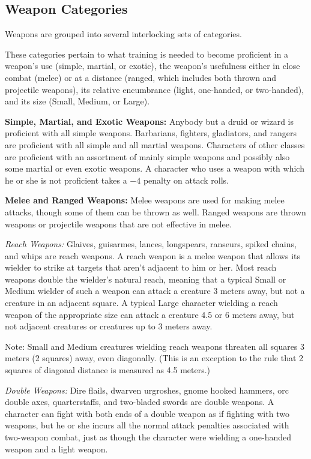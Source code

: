 \subsection{Weapon Categories}
Weapons are grouped into several interlocking sets of categories.

These categories pertain to what training is needed to become proficient in a weapon's use (simple, martial, or exotic), the weapon's usefulness either in close combat (melee) or at a distance (ranged, which includes both thrown and projectile weapons), its relative encumbrance (light, one-handed, or two-handed), and its size (Small, Medium, or Large).

\textbf{Simple, Martial, and Exotic Weapons:} Anybody but a druid or wizard is proficient with all simple weapons. Barbarians, fighters, gladiators, and rangers are proficient with all simple and all martial weapons. Characters of other classes are proficient with an assortment of mainly simple weapons and possibly also some martial or even exotic weapons. A character who uses a weapon with which he or she is not proficient takes a $-4$ penalty on attack rolls.

\textbf{Melee and Ranged Weapons:} Melee weapons are used for making melee attacks, though some of them can be thrown as well. Ranged weapons are thrown weapons or projectile weapons that are not effective in melee.

\textit{Reach Weapons:} Glaives, guisarmes, lances, longspears, ranseurs, spiked chains, and whips are reach weapons. A reach weapon is a melee weapon that allows its wielder to strike at targets that aren't adjacent to him or her. Most reach weapons double the wielder's natural reach, meaning that a typical Small or Medium wielder of such a weapon can attack a creature 3 meters away, but not a creature in an adjacent square. A typical Large character wielding a reach weapon of the appropriate size can attack a creature 4.5 or 6 meters away, but not adjacent creatures or creatures up to 3 meters away.

Note: Small and Medium creatures wielding reach weapons threaten all squares 3 meters (2 squares) away, even diagonally. (This is an exception to the rule that 2 squares of diagonal distance is measured as 4.5 meters.)

\textit{Double Weapons:} Dire flails, dwarven urgroshes, gnome hooked hammers, orc double axes, quarterstaffs, and two-bladed swords are double weapons. A character can fight with both ends of a double weapon as if fighting with two weapons, but he or she incurs all the normal attack penalties associated with two-weapon combat, just as though the character were wielding a one-handed weapon and a light weapon.

